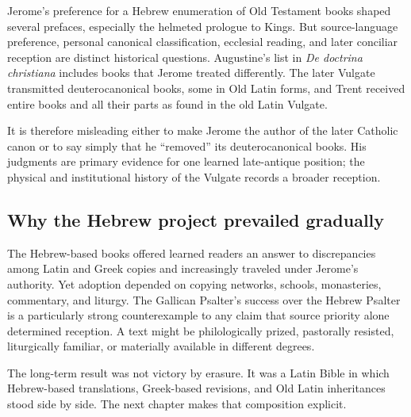 Jerome's preference for a Hebrew enumeration of Old Testament books shaped several prefaces, especially the helmeted prologue to Kings. But source-language preference, personal canonical classification, ecclesial reading, and later conciliar reception are distinct historical questions. Augustine's list in \emph{De doctrina christiana} includes books that Jerome treated differently. The later Vulgate transmitted deuterocanonical books, some in Old Latin forms, and Trent received entire books and all their parts as found in the old Latin Vulgate.

It is therefore misleading either to make Jerome the author of the later Catholic canon or to say simply that he ``removed'' its deuterocanonical books. His judgments are primary evidence for one learned late-antique position; the physical and institutional history of the Vulgate records a broader reception.

\subsection{Why the Hebrew project prevailed gradually}

The Hebrew-based books offered learned readers an answer to discrepancies among Latin and Greek copies and increasingly traveled under Jerome's authority. Yet adoption depended on copying networks, schools, monasteries, commentary, and liturgy. The Gallican Psalter's success over the Hebrew Psalter is a particularly strong counterexample to any claim that source priority alone determined reception. A text might be philologically prized, pastorally resisted, liturgically familiar, or materially available in different degrees.

The long-term result was not victory by erasure. It was a Latin Bible in which Hebrew-based translations, Greek-based revisions, and Old Latin inheritances stood side by side. The next chapter makes that composition explicit.
